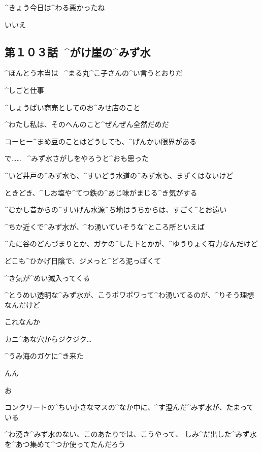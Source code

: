 \Maruko ^{きょう}{今日}は^{わる}{悪}かったね

\Kokone いいえ


\subsection{第１０３話\ ^{がけ}{崖}の^{みず}{水}}

\page[43]
\Alpha ^{ほんとう}{本当}は
\ ^{まる}{丸}^{こ}{子}さんの^{い}{言}うとおりだ

\Alpha ^{しごと}{仕事}

\Alpha ^{しょうばい}{商売}としてのお^{みせ}{店}のこと

\Alpha ^{わたし}{私}は、そのへんのこと^{ぜんぜん}{全然}だめだ

\page
\Alpha コーヒー^{まめ}{豆}のことはどうしても、^{げんかい}{限界}がある

\Alpha で……
\ ^{みず}{水}さがしをやろうと^{おも}{思}った

\Alpha ^{いど}{井戸}の^{みず}{水}も、^{すいどう}{水道}の^{みず}{水}も、まずくはないけど

\Alpha ときどき、^{しお}{塩}や^{てつ}{鉄}の^{あじ}{味}がまじる^{き}{気}がする

\page
\Alpha ^{むかし}{昔}からの^{すいげん}{水源}^{ち}{地}はうちからは、すごく^{とお}{遠}い

\Alpha ^{ちか}{近}くで^{みず}{水}が、^{わ}{湧}いていそうな^{ところ}{所}といえば

\Alpha ^{たに}{谷}のどんづまりとか、ガケの^{した}{下}とかが、^{ゆうりょく}{有力}なんだけど

\page
\Alpha どこも^{ひかげ}{日陰}で、ジメっと^{どろ}{泥}っぽくて

\Alpha ^{き}{気}が^{めい}{滅入}ってくる

\Alpha ^{とうめい}{透明}な^{みず}{水}が、こうポワポワって^{わ}{湧}いてるのが、^{りそう}{理想}なんだけど

\Alpha これなんか

\Alpha カニ^{あな}{穴}からジクジク…

\page
\Alpha ^{うみ}{海}のガケに^{き}{来}た

\Alpha んん

\Alpha お

\page[49]
\Alpha コンクリートの^{ちい}{小}さなマスの^{なか}{中}に、^{す}{澄}んだ^{みず}{水}が、たまっている

\Alpha ^{わ}{湧}き^{みず}{水}のない、このあたりでは、こうやって、
しみ^{だ}{出}した^{みず}{水}を^{あつ}{集}めて^{つか}{使}ってたんだろう

